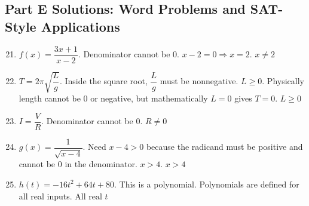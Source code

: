 \documentclass[12pt]{article}
\begin{document}
\subsection*{Part E Solutions: Word Problems and SAT-Style Applications}
\begin{enumerate}
  \setcounter{enumi}{20}
  \item \(f(x) = \dfrac{3x + 1}{x - 2}\).  
  Denominator cannot be 0.  
  \(x - 2 = 0 \Rightarrow x = 2.\)  
  \(\boxed{x \ne 2}\)

  \item \(T = 2\pi \sqrt{\dfrac{L}{g}}\).  
  Inside the square root, \(\dfrac{L}{g}\) must be nonnegative.  
  \(L \ge 0.\)  
  Physically length cannot be 0 or negative, but mathematically \(L = 0\) gives \(T = 0\).  
  \(\boxed{L \ge 0}\)

  \item \(I = \dfrac{V}{R}\).  
  Denominator cannot be 0.  
  \(\boxed{R \ne 0}\)

  \item \(g(x) = \dfrac{1}{\sqrt{x - 4}}\).  
  Need \(x - 4 > 0\) because the radicand must be positive and cannot be 0 in the denominator.  
  \(x > 4.\)  
  \(\boxed{x > 4}\)

  \item \(h(t) = -16t^2 + 64t + 80\).  
  This is a polynomial. Polynomials are defined for all real inputs.  
  \(\boxed{\text{All real } t}\)
\end{enumerate}
\end{document}

